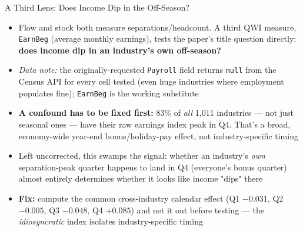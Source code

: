 \documentclass[aspectratio=169]{beamer}
\begin{document}
\begin{frame}{A Third Lens: Does Income Dip in the Off-Season?}
  \begin{itemize}
    \item Flow and stock both measure separations/headcount. A third QWI
          measure, \texttt{EarnBeg} (average monthly earnings), tests the
          paper's title question directly: \textbf{does income dip in an
          industry's own off-season?}
    \item \textit{Data note:} the originally-requested \texttt{Payroll}
          field returns \texttt{null} from the Census API for every cell
          tested (even huge industries where employment populates fine);
          \texttt{EarnBeg} is the working substitute
    \bigskip
    \item \textbf{A confound has to be fixed first:} 83\% of \emph{all}
          1,011 industries --- not just seasonal ones --- have their raw
          earnings index peak in Q4. That's a broad, economy-wide
          year-end bonus/holiday-pay effect, not industry-specific timing
    \item Left uncorrected, this swamps the signal: whether an industry's
          \emph{own} separation-peak quarter happens to land in Q4 (everyone's
          bonus quarter) almost entirely determines whether it looks like
          income "dips" there
    \item[$\to$] \textbf{Fix:} compute the common cross-industry calendar
          effect (Q1 $-0.031$, Q2 $-0.005$, Q3 $-0.048$, Q4 $+0.085$) and net
          it out before testing --- the \emph{idiosyncratic} index isolates
          industry-specific timing
  \end{itemize}
\end{frame}
\end{document}
